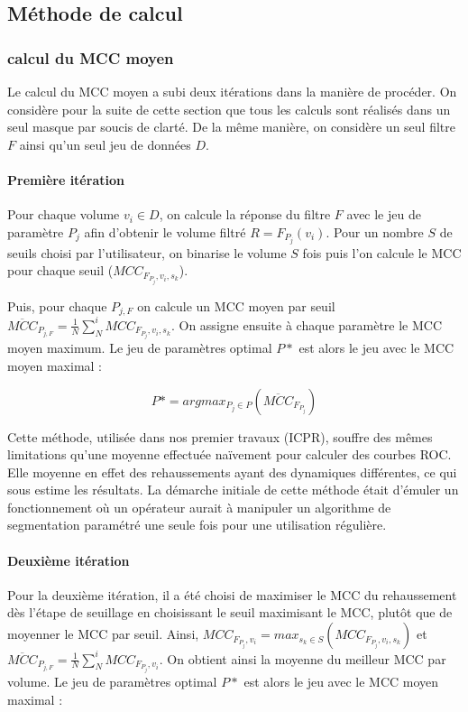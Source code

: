 \subsection{Méthode de calcul}
\subsubsection{calcul du MCC moyen}
  Le calcul du MCC moyen a subi deux itérations dans la manière de procéder.  On considère pour la suite de cette section que tous les calculs sont réalisés dans un seul masque par soucis de clarté. De la même manière, on considère un seul filtre $F$ ainsi qu'un seul jeu de données $D$.

  \paragraph{Première itération}
  Pour chaque volume $v_i \in D$, on calcule la réponse du filtre $F$ avec le jeu de paramètre $P_j$ afin d'obtenir le volume filtré $R = F_{P_j}(v_i)$. Pour un nombre $S$ de seuils choisi par l'utilisateur, on binarise le volume $S$ fois puis l'on calcule le MCC pour chaque seuil ($MCC_{F_{P_j},v_i,s_k}$).
  
  Puis, pour chaque $P_{j,F}$ on calcule un MCC moyen par seuil $\overline{MCC}_{ P_{j,F} } =  \frac{1}{N} \sum_{N}^i MCC_{F_{P_j},v_i,s_k}$. On assigne ensuite à chaque paramètre le MCC moyen maximum. Le jeu de paramètres optimal $P*$ est alors le jeu avec le MCC moyen maximal :
  
  \begin{equation}
    P* =  argmax_ {P_j \in P}( \overline{MCC}_{ F_{P_j} } )
  \end{equation}

  Cette méthode, utilisée dans nos premier travaux (ICPR), souffre des mêmes limitations qu'une moyenne effectuée naïvement pour calculer des courbes ROC. Elle moyenne en effet des rehaussements ayant des dynamiques différentes, ce qui sous estime les résultats. La démarche initiale de cette méthode était d'émuler un fonctionnement où un opérateur aurait à manipuler un algorithme de segmentation paramétré une seule fois pour une utilisation régulière.
  
  \paragraph{Deuxième itération}
  Pour la deuxième itération, il a été choisi de maximiser le MCC du rehaussement dès l'étape de seuillage en choisissant le seuil maximisant le MCC, plutôt que de moyenner le MCC par seuil. Ainsi, $MCC_{F_{P_j},v_i} = max_{s_k \in S} ( MCC_{F_{P_j},v_i,s_k} ) $ et  $\overline{MCC}_{ P_{j,F} } =  \frac{1}{N} \sum_{N}^i MCC_{F_{P_j},v_i} $. On obtient ainsi la moyenne du meilleur MCC par volume. Le jeu de paramètres optimal $P*$ est alors le jeu avec le MCC moyen maximal :
  
